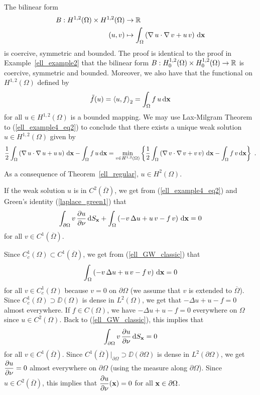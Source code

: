 \begin{egg}
The bilinear form
\begin{align*}
B:H^{1,2}(\Omega)\times H^{1,2}(\Omega) &\rightarrow \mathbb{R} \\
(u,v) &\mapsto \int_\Omega \left( \operatorname{\nabla} u \cdot \operatorname{\nabla} v + u\, v\right)
\,\mathrm{d}{\mathbf{x}}
\end{align*}
is coercive, symmetric and bounded.  The proof is identical to the
proof in Example~\ref{ell_example2} that the bilinear form
$\displaystyle B:H^{1,2}_0(\Omega)\times H^{1,2}_0(\Omega) \rightarrow \mathbb{R}$
is coercive, symmetric and bounded.  Moreover, we also have that the
functional on $\displaystyle H^{1,2}(\Omega)$ defined by 
\[
\tilde{f}(u) = \left\langle{u} , {f}\right\rangle_2 = \int_\Omega f\, u\,\mathrm{d}{\mathbf{x}}
\]
for all $\displaystyle u \in H^{1,2}(\Omega)$ is a bounded mapping.
We may use Lax-Milgram Theorem to
(\ref{ell_example4_eq2}) to conclude that there exists a unique weak
solution $\displaystyle u \in H^{1,2}(\Omega)$ given by
\[
\frac{1}{2} \int_\Omega \left( \graD u \cdot \graD u 
+u\, u \right) \dx{\VEC{x}} -\int_\Omega f\, u \dx{\VEC{x}}
= \min_{v\in H^{1,2}(\Omega)} \left\{ \frac{1}{2}
\int_\Omega \left( \graD v \cdot \graD v 
+v\, v \right) \dx{\VEC{x}} -\int_\Omega f\, v \dx{\VEC{x}} \right\} \ .
\]

As a consequence of Theorem~\ref{ell_regular}, $\displaystyle u\in H^2(\Omega)$.

If the weak solution $u$ is in $\displaystyle C^2(\overline{\Omega})$,
we get from (\ref{ell_example4_eq2}) and Green's identity (\ref{laplace_green1})
that
\begin{equation} \label{ell_GW_classic}
\int_{\partial \Omega} v\,\frac{\partial{u}}{\partial \mathbf{\nu}} \,\mathrm{d}{S}_{\mathbf{x}}
+ \int_\Omega \left( - v\, \Delta u + u\, v - f\, v \right) \,\mathrm{d}{\mathbf{x}} = 0
\end{equation}
for all $\displaystyle v \in C^1(\overline{\Omega})$.

Since $\displaystyle C^1_c(\Omega) \subset C^1(\overline{\Omega})$, we get from
(\ref{ell_GW_classic}) that
\[
\int_\Omega \left( - v\, \Delta u + u\, v - f\, v \right) \,\mathrm{d}{\mathbf{x}} = 0
\]
for all $\displaystyle v \in C^1_c(\Omega)$ 
because $v=0$ on $\partial \Omega$ (we assume that $v$ is extended to
$\overline{\Omega}$).  Since $\displaystyle C^1_c(\Omega)
\supset \DD(\Omega)$ is dense in
$\displaystyle L^2(\Omega)$, we get that
$\displaystyle -\Delta u + u - f = 0$ almost
everywhere.  If $f \in C(\Omega)$, we have
$\displaystyle -\Delta u + u -f = 0$ everywhere on $\Omega$ since
$\displaystyle u\in C^2(\Omega)$.  Back to (\ref{ell_GW_classic}),
this implies that
\[
\int_{\partial \Omega} v\,\frac{\partial{u}}{\partial \mathbf{\nu}} \,\mathrm{d}{S}_{\mathbf{x}} = 0
\]
for all $\displaystyle v \in C^1(\overline{\Omega})$.
Since $\displaystyle C^1(\overline{\Omega})\big|_{\partial \Omega}
\supset \DD(\partial \Omega)$ is dense in $L^2(\partial \Omega)$,
we get $\displaystyle \frac{\partial{u}}{\partial \mathbf{\nu}} =0$ almost everywhere on
$\partial \Omega$ (using the measure along $\partial \Omega$).  Since
$\displaystyle u\in C^2(\overline{\Omega})$, this implies that
$\displaystyle \frac{\partial{u}}{\partial \mathbf{\nu}}(\mathbf{x}) =0$ for all
$\mathbf{x} \in \partial \Omega$.
\end{egg}

